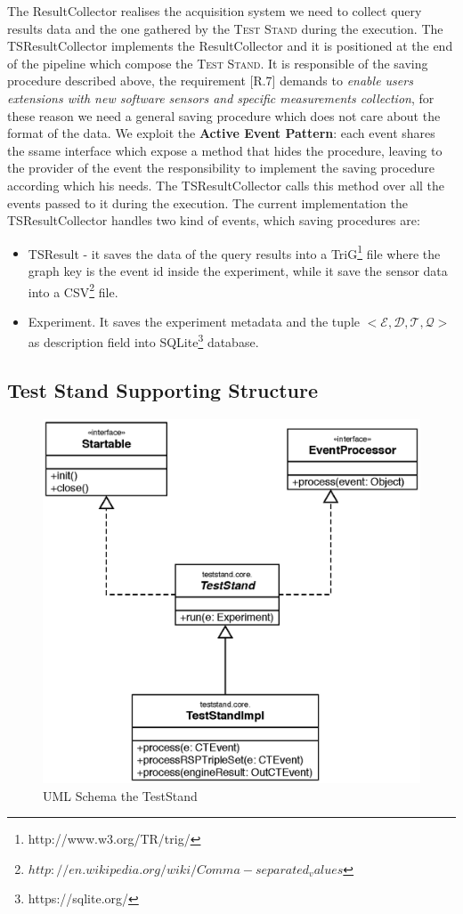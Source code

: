 The ResultCollector realises the acquisition system we need to collect query results data and the one gathered by the \textsc{Test Stand} during the execution. The TSResultCollector implements the ResultCollector  and it is positioned at the end of the pipeline which compose the \textsc{Test Stand}. It is responsible of the saving procedure described above, the requirement [R.7] demands to \textit{enable users extensions with new software sensors and specific measurements collection}, for these reason we need a general saving procedure which does not care about the format of the data. We exploit the \textbf{Active Event Pattern}: each event shares the ssame interface which  expose a method that hides the procedure, leaving to the provider of the event the responsibility to implement the saving procedure according which his needs. The TSResultCollector calls this method over all the events passed to it during the execution. The current implementation the TSResultCollector handles two kind of events, which saving procedures are:
\begin{itemize}
\item TSResult - it saves the data of the query results into a TriG\footnote{http://www.w3.org/TR/trig/} file where the graph key is the event id inside the experiment, while it save the sensor data into a CSV\footnote{$http://en.wikipedia.org/wiki/Comma-separated_values$} file. 
\item Experiment. It saves the experiment metadata and the tuple $<\mathcal{E},\mathcal{D},\mathcal{T},\mathcal{Q}>$ as description field into SQLite\footnote{https://sqlite.org/} database.
\end{itemize} 

\subsection{Test Stand Supporting Structure}\label{sec:teststand}


\begin{figure}[tbh]
  \centering
	\includegraphics[width=0.5\linewidth]{images/uml_teststand}
	\caption{UML Schema the TestStand} 
  	\label{fig:module-fsm}
\end{figure}


